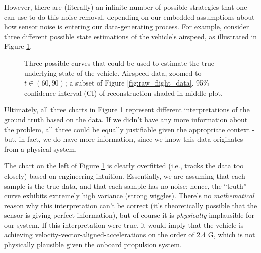 \documentclass[conf]{new-aiaa}
\begin{document}
    However, there are (literally) an infinite number of possible strategies that one can use to do this noise removal, depending on our embedded assumptions about how sensor noise is entering our data-generating process. For example, consider three different possible state estimations of the vehicle's airspeed, as illustrated in Figure \ref{fig:under_over_fitting}.

    \begin{figure}[H]
        \centering
        \caption{Three possible curves that could be used to estimate the true underlying state of the vehicle. Airspeed data, zoomed to $t \in (60, 90)$; a subset of Figure \ref{fig:raw_flight_data}. 95\% confidence interval (CI) of reconstruction shaded in middle plot.}
        \label{fig:under_over_fitting}
    \end{figure}

    Ultimately, all three charts in Figure \ref{fig:under_over_fitting} represent different interpretations of the ground truth based on the data. If we didn't have any more information about the problem, all three could be equally justifiable given the appropriate context - but, in fact, we do have more information, since we know this data originates from a physical system.

    The chart on the left of Figure \ref{fig:under_over_fitting} is clearly overfitted (i.e., tracks the data too closely) based on engineering intuition. Essentially, we are assuming that each sample is the true data, and that each sample has no noise; hence, the ``truth'' curve exhibits extremely high variance (strong wiggles). There's no \emph{mathematical} reason why this interpretation can't be correct (it's theoretically possible that the sensor is giving perfect information), but of course it is \emph{physically} implausible for our system. If this interpretation were true, it would imply that the vehicle is achieving velocity-vector-aligned-accelerations on the order of 2.4 G, which is not physically plausible given the onboard propulsion system.
\end{document}
